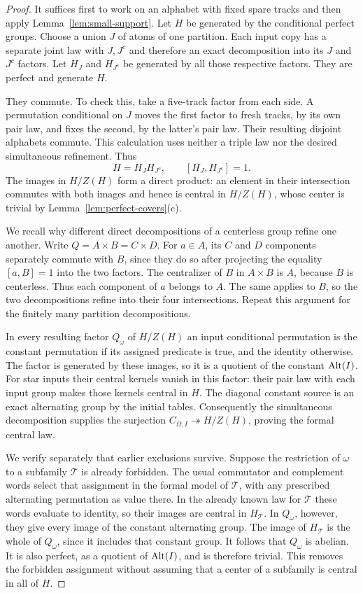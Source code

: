 \begin{proof}
It suffices first to work on an alphabet with fixed spare
tracks and then apply Lemma~\ref{lem:small-support}.  Let
$H$ be generated by the conditional perfect groups.  Choose
a union $J$ of atoms of one partition.  Each input copy has
a separate joint law with $J,J^c$ and therefore an exact
decomposition into its $J$ and $J^c$ factors.  Let $H_J$
and $H_{J^c}$ be generated by all those respective factors.
They are perfect and generate $H$.

They commute.  To check this, take a five-track factor from
each side.  A permutation conditional on $J$ moves the first
factor to fresh tracks, by its own pair law, and fixes the
second, by the latter's pair law.  Their resulting disjoint
alphabets commute.  This calculation uses neither a triple
law nor the desired simultaneous refinement.  Thus
\[
 H=H_JH_{J^c},\qquad [H_J,H_{J^c}]=1.
\]
The images in $H/Z(H)$ form a direct product: an element in
their intersection commutes with both images and hence is
central in $H/Z(H)$, whose center is trivial by
Lemma~\ref{lem:perfect-covers}(c).

We recall why different direct decompositions of a centerless
group refine one another.  Write $Q=A\times B=C\times D$.
For $a\in A$, its $C$ and $D$ components separately commute
with $B$, since they do so after projecting the equality
$[a,B]=1$ into the two factors.  The centralizer of $B$ in
$A\times B$ is $A$, because $B$ is centerless.  Thus each
component of $a$ belongs to $A$.  The same applies to $B$,
so the two decompositions refine into their four
intersections.  Repeat this argument for the finitely many
partition decompositions.

In every resulting factor $Q_\omega$ of $H/Z(H)$ an input
conditional permutation is the constant permutation if its
assigned predicate is true, and the identity otherwise.
The factor is generated by these images, so it is a quotient
of the constant $\operatorname{Alt}(I)$.  For star inputs their central
kernels vanish in this factor: their pair law with each
input group makes those kernels central in $H$.
The diagonal constant source is an exact alternating group
by the initial tables.  Consequently the simultaneous
decomposition supplies the surjection
$C_{\Omega,I}\twoheadrightarrow H/Z(H)$, proving the formal
central law.

We verify separately that earlier exclusions survive.
Suppose the restriction of $\omega$ to a subfamily
$\mathcal T$ is already forbidden.  The usual commutator
and complement words select that assignment in the formal
model of $\mathcal T$, with any prescribed alternating
permutation as value there.  In the already known law for
$\mathcal T$ these words evaluate to identity, so their
images are central in $H_{\mathcal T}$.  In $Q_\omega$,
however, they give every image of the constant alternating
group.  The image of $H_{\mathcal T}$ is the whole of
$Q_\omega$, since it includes that constant group.
It follows that $Q_\omega$ is abelian.  It is also perfect,
as a quotient of $\operatorname{Alt}(I)$, and is therefore trivial.
This removes the forbidden assignment without assuming
that a center of a subfamily is central in all of $H$.


\end{proof}

